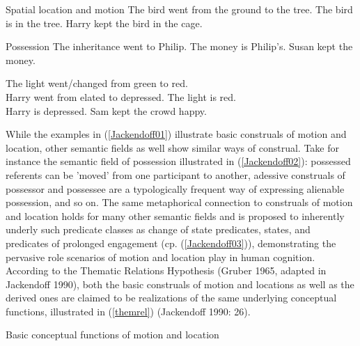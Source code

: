 \ea \label{Jackendoff01} Spatial location and motion
\ea  The bird went from the ground to the tree.
\ex The bird is in the tree.
\ex Harry kept the bird in the cage.
\z
\z

\ea \label{Jackendoff02} Possession
\ea The inheritance went to Philip.
\ex The money is Philip's.
\ex Susan kept the money.
\z
\z

\ea%
\ea The light went/changed from green to red. \\
Harry went from elated to depressed.
\ex The light is red. \\
Harry is depressed.
\ex Sam kept the crowd happy.
\z
\z

While the examples in (\ref{Jackendoff01}) illustrate basic construals of motion and location, other semantic fields as well show similar ways of construal. Take for instance the semantic field of possession illustrated in (\ref{Jackendoff02}): possessed referents can be 'moved' from one participant to another, adessive construals of possessor and possessee are a typologically frequent way of expressing alienable possession, and so on. The same metaphorical connection to construals of motion and location holds for many other semantic fields and is proposed to inherently underly such predicate classes as change of state predicates, states, and predicates of prolonged engagement (cp. (\ref{Jackendoff03})), demonstrating the pervasive role scenarios of motion and location play in human cognition. According to the Thematic Relations Hypothesis (Gruber 1965, adapted in Jackendoff 1990), both the basic construals of motion and locations as well as the derived ones are claimed to be realizations of the same underlying conceptual functions, illustrated in (\ref{themrel}) (Jackendoff 1990: 26).

\ea \label{themrel}
Basic conceptual functions of motion and location
\z

\avmsortfont{\it}
{\scriptsize
\begin{avm}
\end{avm}
}

\smallskip
{\scriptsize
\begin{avm}
\end{avm}
}

